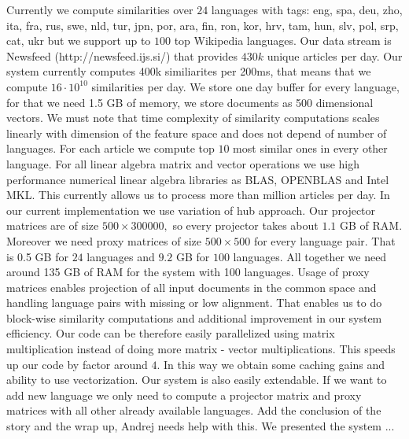 \documentclass[twoside,11pt]{article}
\begin{document}
Currently we compute similarities over $24$ languages with tags: eng, spa, deu, zho, ita, fra, rus, swe, nld, tur, jpn, por, ara, fin, ron, kor, hrv, tam, hun, slv, pol, srp, cat, ukr but we support up to $100$ top Wikipedia languages. Our data stream is Newsfeed (http://newsfeed.ijs.si/) that provides $430k$ unique articles per day. Our system currently computes 400k similiarites per 200ms, that means that we compute $16 \cdot 10^{10}$ similarities per day. We
store one day buffer for every language, for that we need 1.5 GB of memory, we store documents as 500 dimensional vectors. We must note that time complexity of similarity computations scales linearly with dimension of the feature space and does not  depend of number of languages. For each article we compute top $10$  most similar ones in every other language.
For all linear algebra matrix and vector operations we use high performance numerical linear algebra libraries as BLAS, OPENBLAS and Intel MKL. This currently allows us to process more than million articles per day.
In our current implementation we use variation of hub approach. Our projector matrices are of size $500\times 300000,$ so every projector takes about $1.1$ GB of RAM. Moreover we need proxy matrices of size $500\times500$ for every language pair. That is 0.5 GB for $24$ languages and $9.2$ GB for $100$ languages. All together we need around 135 GB of RAM for the system with 100 languages.
 Usage of proxy matrices enables projection of all input documents in the common space and handling language pairs with missing or low alignment. That enables us to do block-wise similarity computations and
additional improvement in our system efficiency. Our code can be therefore easily parallelized using matrix multiplication instead of doing more matrix - vector multiplications. This speeds up our code by factor around $4.$ In this way we obtain some caching gains and ability to use vectorization.
Our system is also easily extendable. If we want to add new language we only need to compute a projector matrix and proxy matrices with all other already available languages.
Add the conclusion of the story and the wrap up, Andrej needs help with this. We presented the system ...



\vskip 0.2in


\end{document}
